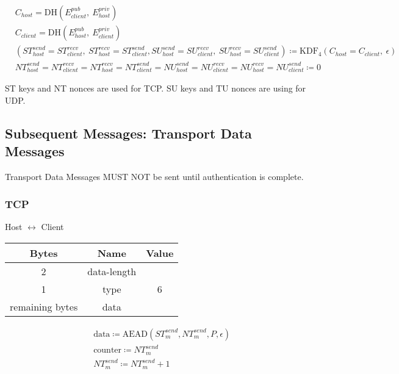 \begin{align*}
    & C_{host} = \text{DH}(E_{client}^{pub},\ E_{host}^{priv})\\
    & C_{client} = \text{DH}(E_{host}^{pub},\ E_{client}^{priv})\\
    & (\mathit{ST}_{host}^{send} = \mathit{ST}_{client}^{recv},\ \mathit{ST}_{host}^{recv} = \mathit{ST}_{client}^{send}, \mathit{SU}_{host}^{send} = \mathit{SU}_{client}^{recv},\ \mathit{SU}_{host}^{recv} = \mathit{SU}_{client}^{send}) \coloneqq \text{KDF}_4(C_{host} = C_{client},
    \ \epsilon) \\
    & \mathit{NT}_{host}^{send} = \mathit{NT}_{client}^{recv} = \mathit{NT}_{host}^{recv} = \mathit{NT}_{client}^{send} = \mathit{NU}_{host}^{send} = \mathit{NU}_{client}^{recv} = \mathit{NU}_{host}^{recv} = \mathit{NU}_{client}^{send} \coloneqq 0
\end{align*}

ST keys and NT nonces are used for TCP. SU keys and TU nonces are using for UDP.

\subsection{Subsequent Messages: Transport Data Messages}

Transport Data Messages MUST NOT be sent until authentication is complete.

\subsubsection{TCP}

\begin{center}
    Host $\leftrightarrow$ Client\\
    \begin{tabular}{|c|c|c|}
        \hline
        \textbf{Bytes}  & \textbf{Name} & \textbf{Value} \\
        \hline
        2               & data-length   &                \\
        \hline
        1               & type          & 6              \\
        \hline
        remaining bytes & data          &                \\
        \hline
    \end{tabular}
\end{center}

\begin{align*}
    & \text{data} \coloneqq \text{AEAD}(\mathit{ST}_{m}^{send},\mathit{NT}_{m}^{send}, P, \epsilon)\\
    & \text{counter} \coloneqq \mathit{NT}_{m}^{send}\\
    & \mathit{NT}_{m}^{send} \coloneqq \mathit{NT}_{m}^{send} + 1
\end{align*}


